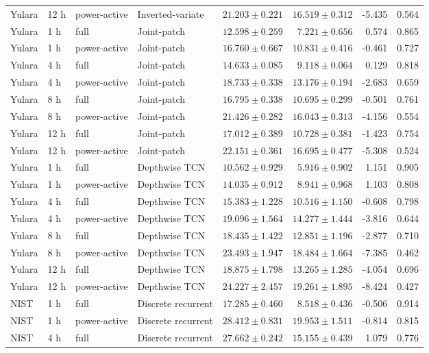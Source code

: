 \begin{longtable}{lll l rrrr}
Yulara & 12 h & power-active & Inverted-variate & $21.203\pm0.221$ & $16.519\pm0.312$ & -5.435 & 0.564\\
Yulara & 1 h & full & Joint-patch & $12.598\pm0.259$ & $7.221\pm0.656$ & 0.574 & 0.865\\
Yulara & 1 h & power-active & Joint-patch & $16.760\pm0.667$ & $10.831\pm0.416$ & -0.461 & 0.727\\
Yulara & 4 h & full & Joint-patch & $14.633\pm0.085$ & $9.118\pm0.064$ & 0.129 & 0.818\\
Yulara & 4 h & power-active & Joint-patch & $18.733\pm0.338$ & $13.176\pm0.194$ & -2.683 & 0.659\\
Yulara & 8 h & full & Joint-patch & $16.795\pm0.338$ & $10.695\pm0.299$ & -0.501 & 0.761\\
Yulara & 8 h & power-active & Joint-patch & $21.426\pm0.282$ & $16.043\pm0.313$ & -4.156 & 0.554\\
Yulara & 12 h & full & Joint-patch & $17.012\pm0.389$ & $10.728\pm0.381$ & -1.423 & 0.754\\
Yulara & 12 h & power-active & Joint-patch & $22.151\pm0.361$ & $16.695\pm0.477$ & -5.308 & 0.524\\
Yulara & 1 h & full & Depthwise TCN & $10.562\pm0.929$ & $5.916\pm0.902$ & 1.151 & 0.905\\
Yulara & 1 h & power-active & Depthwise TCN & $14.035\pm0.912$ & $8.941\pm0.968$ & 1.103 & 0.808\\
Yulara & 4 h & full & Depthwise TCN & $15.383\pm1.228$ & $10.516\pm1.150$ & -0.608 & 0.798\\
Yulara & 4 h & power-active & Depthwise TCN & $19.096\pm1.564$ & $14.277\pm1.444$ & -3.816 & 0.644\\
Yulara & 8 h & full & Depthwise TCN & $18.435\pm1.422$ & $12.851\pm1.196$ & -2.877 & 0.710\\
Yulara & 8 h & power-active & Depthwise TCN & $23.493\pm1.947$ & $18.484\pm1.664$ & -7.385 & 0.462\\
Yulara & 12 h & full & Depthwise TCN & $18.875\pm1.798$ & $13.265\pm1.285$ & -4.054 & 0.696\\
Yulara & 12 h & power-active & Depthwise TCN & $24.227\pm2.457$ & $19.261\pm1.895$ & -8.424 & 0.427\\
NIST & 1 h & full & Discrete recurrent & $17.285\pm0.460$ & $8.518\pm0.436$ & -0.506 & 0.914\\
NIST & 1 h & power-active & Discrete recurrent & $28.412\pm0.831$ & $19.953\pm1.511$ & -0.814 & 0.815\\
NIST & 4 h & full & Discrete recurrent & $27.662\pm0.242$ & $15.155\pm0.439$ & 1.079 & 0.776\\

\end{longtable}
